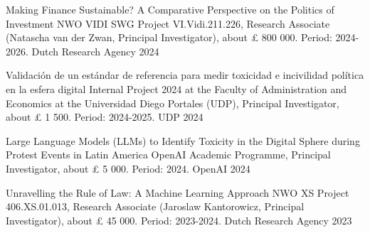 





\vspace{1mm}

\begin{cvhonors}
\cvhonor
{Making Finance Sustainable? A Comparative Perspective on the Politics of Investment}
{NWO VIDI SWG Project VI.Vidi.211.226, Research Associate (Natascha van der Zwan, Principal Investigator), about {\pounds} 800 000. Period: 2024-2026.}
{Dutch Research Agency}
{2024}
\end{cvhonors}

\vspace{1mm}

\begin{cvhonors}
\cvhonor
{Validación de un estándar de referencia para medir toxicidad e incivilidad política en la esfera digital}
{Internal Project 2024 at the Faculty of Administration and Economics at the Universidad Diego Portales (UDP), Principal Investigator, about {\pounds} 1 500. Period: 2024-2025.}
{UDP}
{2024}
\end{cvhonors}

\vspace{1mm}

\begin{cvhonors}
\cvhonor
{Large Language Models (LLMs) to Identify Toxicity in the Digital Sphere during Protest Events in Latin America}
{OpenAI Academic Programme, Principal Investigator, about {\pounds} 5 000. Period: 2024.}
{OpenAI}
{2024}
\end{cvhonors}

\vspace{1mm}

\begin{cvhonors}
\cvhonor
{Unravelling the Rule of Law: A Machine Learning Approach}
{NWO XS Project 406.XS.01.013, Research Associate (Jaroslaw Kantorowicz, Principal Investigator), about {\pounds} 45 000. Period: 2023-2024.}
{Dutch Research Agency}
{2023}
\end{cvhonors}

